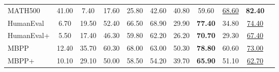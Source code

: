 \documentclass[]{bytedance_seed}
\newcommand{\1}{\mathbf{1}}
\begin{document}
\begin{table}[htbp]
\begin{tabular}{@{}lcccccccccc@{}}
MATH500 & 41.00 & 7.40 & 17.60 & 25.80 & 42.60 & 40.80 & 59.60 & \underline{68.60} & \cellcolor{lightergray}\textbf{82.40} \\
HumanEval & 6.70 & 19.50 & 52.40 & 66.50 & 68.90 & 29.90 & \textbf{77.40} & 34.80 & \cellcolor{lightergray}\underline{74.40} \\
HumanEval+ & 5.50 & 17.40 & 46.30 & 59.80 & 62.20 & 26.20 & \textbf{70.70} & 29.30 & \cellcolor{lightergray}\underline{67.40} \\
MBPP & 12.40 & 35.70 & 60.30 & 68.00 & 63.00 & 50.30 & \textbf{78.80} & 60.60 & \cellcolor{lightergray}\underline{73.00} \\
MBPP+ & 10.10 & 29.10 & 50.00 & 58.50 & 54.20 & 39.70 & \textbf{65.90} & 51.10 & \cellcolor{lightergray}\underline{62.70} \\
\bottomrule
\end{tabular}
\end{table}
\end{document}
